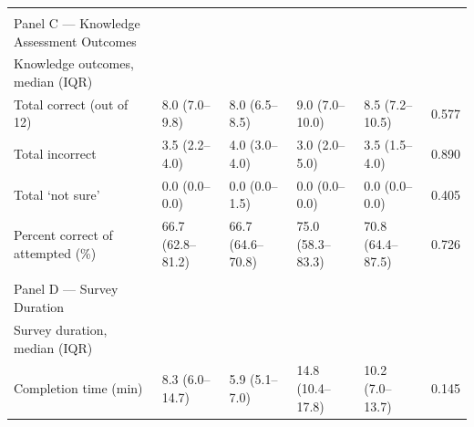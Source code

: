 \begin{longtable}{llllll}
 &  &  &  &  &  \\
Panel C — Knowledge Assessment Outcomes &  &  &  &  &  \\
Knowledge outcomes, median (IQR) &  &  &  &  &  \\
  Total correct (out of 12) & 8.0 (7.0–9.8) & 8.0 (6.5–8.5) & 9.0 (7.0–10.0) & 8.5 (7.2–10.5) & 0.577 \\
  Total incorrect & 3.5 (2.2–4.0) & 4.0 (3.0–4.0) & 3.0 (2.0–5.0) & 3.5 (1.5–4.0) & 0.890 \\
  Total ‘not sure’ & 0.0 (0.0–0.0) & 0.0 (0.0–1.5) & 0.0 (0.0–0.0) & 0.0 (0.0–0.0) & 0.405 \\
  Percent correct of attempted (\%) & 66.7 (62.8–81.2) & 66.7 (64.6–70.8) & 75.0 (58.3–83.3) & 70.8 (64.4–87.5) & 0.726 \\
 &  &  &  &  &  \\
Panel D — Survey Duration &  &  &  &  &  \\
Survey duration, median (IQR) &  &  &  &  &  \\
  Completion time (min) & 8.3 (6.0–14.7) & 5.9 (5.1–7.0) & 14.8 (10.4–17.8) & 10.2 (7.0–13.7) & 0.145 \\
\end{longtable}
